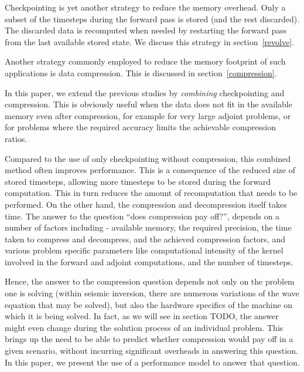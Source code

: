 Checkpointing is yet another strategy to reduce the memory
overhead. Only a subset of the timesteps during the forward pass is
stored (and the rest discarded). The discarded data is recomputed when
needed by restarting the forward pass from the last available stored
state. We discuss this strategy in section~\ref{revolve}.

Another strategy commonly employed to reduce the memory footprint of
such applications is data compression. This is discussed in
section~\ref{compression}. 

In this paper, we extend the previous studies by \emph{combining} checkpointing
and compression. This is obviously useful when the data does not fit in the
available memory even after compression, for example for very large adjoint
problems, or for problems where the required accuracy limits the achievable
compression ratios.

Compared to the use of only checkpointing without compression, this
combined method often improves performance. This is a consequence of
the reduced size of stored timesteps, allowing more timesteps to be
stored during the forward computation. This in turn reduces the amount
of recomputation that needs to be performed. On the other hand, the
compression and decompression itself takes time. The answer to the
question ``does compression pay off?'', depends on a number of factors including - available
memory, the required precision, the time taken to compress and
decompress, and the achieved compression factors, and various problem specific
parameters like computational intensity of the kernel involved in the
forward and adjoint computations, and the number of timesteps.

Hence, the answer to the compression question depends not only on the
problem one is solving (within seismic inversion, there are numerous
variations of the wave equation that may be solved), but also the
hardware specifics of the machine on which it is being solved. In
fact, as we will see in section TODO, the answer might even change
during the solution process of an individual problem. This brings up
the need to be able to predict whether compression would pay off in a
given scenario, without incurring significant overheads in answering
this question. In this paper, we present the use of a performance
model to answer that question.

